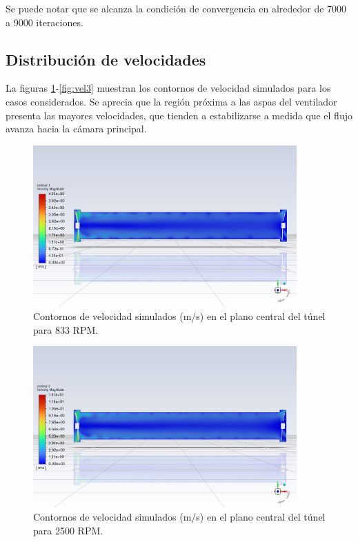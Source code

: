 Se puede notar que se alcanza la condición de convergencia en alrededor de 7000 a 9000 iteraciones.

\newpage
\subsection{Distribución de velocidades}
La figuras \ref{fig:vel1}-\ref{fig:vel3} muestran los contornos de velocidad simulados para los casos considerados. Se aprecia que la región próxima a las aspas del ventilador presenta las mayores velocidades, que tienden a estabilizarse a medida que el flujo avanza hacia la cámara principal.

\begin{figure}[ht!]
    \centering
    \includegraphics[width=0.9\textwidth]{images/vel1.png}
    \caption{Contornos de velocidad simulados (m/s) en el plano central del túnel para 833 RPM.}
    \label{fig:vel1}
\end{figure}

\begin{figure}[ht!]
    \centering
    \includegraphics[width=0.9\textwidth]{images/vel2.png}
    \caption{Contornos de velocidad simulados (m/s) en el plano central del túnel para 2500 RPM.}
    \label{fig:vel2}
\end{figure}

